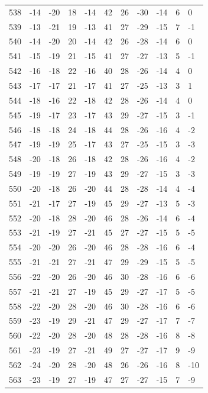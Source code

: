 \begin{table}[H]
\begin{tabular}{lllllllllll}
538 & -14 & -20 & 18 & -14 & 42 & 26 & -30 & -14 & 6 & 0 \\
539 & -13 & -21 & 19 & -13 & 41 & 27 & -29 & -15 & 7 & -1 \\
540 & -14 & -20 & 20 & -14 & 42 & 26 & -28 & -14 & 6 & 0 \\
541 & -15 & -19 & 21 & -15 & 41 & 27 & -27 & -13 & 5 & -1 \\
542 & -16 & -18 & 22 & -16 & 40 & 28 & -26 & -14 & 4 & 0 \\
543 & -17 & -17 & 21 & -17 & 41 & 27 & -25 & -13 & 3 & 1 \\
544 & -18 & -16 & 22 & -18 & 42 & 28 & -26 & -14 & 4 & 0 \\
545 & -19 & -17 & 23 & -17 & 43 & 29 & -27 & -15 & 3 & -1 \\
546 & -18 & -18 & 24 & -18 & 44 & 28 & -26 & -16 & 4 & -2 \\
547 & -19 & -19 & 25 & -17 & 43 & 27 & -25 & -15 & 3 & -3 \\
548 & -20 & -18 & 26 & -18 & 42 & 28 & -26 & -16 & 4 & -2 \\
549 & -19 & -19 & 27 & -19 & 43 & 29 & -27 & -15 & 3 & -3 \\
550 & -20 & -18 & 26 & -20 & 44 & 28 & -28 & -14 & 4 & -4 \\
551 & -21 & -17 & 27 & -19 & 45 & 29 & -27 & -13 & 5 & -3 \\
552 & -20 & -18 & 28 & -20 & 46 & 28 & -26 & -14 & 6 & -4 \\
553 & -21 & -19 & 27 & -21 & 45 & 27 & -27 & -15 & 5 & -5 \\
554 & -20 & -20 & 26 & -20 & 46 & 28 & -28 & -16 & 6 & -4 \\
555 & -21 & -21 & 27 & -21 & 47 & 29 & -29 & -15 & 5 & -5 \\
556 & -22 & -20 & 26 & -20 & 46 & 30 & -28 & -16 & 6 & -6 \\
557 & -21 & -21 & 27 & -19 & 45 & 29 & -27 & -17 & 5 & -5 \\
558 & -22 & -20 & 28 & -20 & 46 & 30 & -28 & -16 & 6 & -6 \\
559 & -23 & -19 & 29 & -21 & 47 & 29 & -27 & -17 & 7 & -7 \\
560 & -22 & -20 & 28 & -20 & 48 & 28 & -28 & -16 & 8 & -8 \\
561 & -23 & -19 & 27 & -21 & 49 & 27 & -27 & -17 & 9 & -9 \\
562 & -24 & -20 & 28 & -20 & 48 & 26 & -26 & -16 & 8 & -10 \\
563 & -23 & -19 & 27 & -19 & 47 & 27 & -27 & -15 & 7 & -9 \\

\end{tabular}
\end{table}
